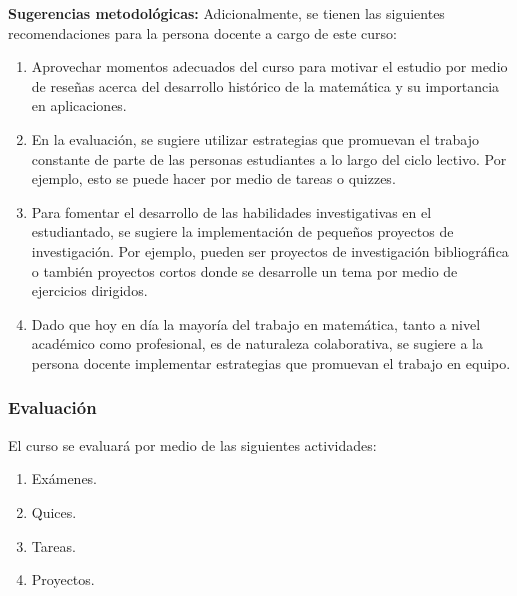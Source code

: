 \begin{refsection}
\textbf{Sugerencias metodológicas:} Adicionalmente, se tienen las siguientes recomendaciones para la persona docente a cargo de este curso:
\begin{enumerate}
    \item Aprovechar momentos adecuados del curso para motivar el estudio por medio de reseñas acerca del desarrollo histórico de la matemática y su importancia en aplicaciones.
    \item En la evaluación, se sugiere utilizar estrategias que promuevan el trabajo constante de parte de las personas estudiantes a lo largo del ciclo lectivo. Por ejemplo, esto se puede hacer por medio de tareas o quizzes.
    \item Para fomentar el desarrollo de las habilidades investigativas en el estudiantado, se sugiere la implementación de pequeños proyectos de investigación. Por ejemplo, pueden ser proyectos de investigación bibliográfica o también proyectos cortos donde se desarrolle un tema por medio de ejercicios dirigidos.
    \item Dado que hoy en día la mayoría del trabajo en matemática, tanto a nivel académico como profesional, es de naturaleza colaborativa, se sugiere a la persona docente implementar estrategias que promuevan el trabajo en equipo.
\end{enumerate}




\subsubsection*{Evaluación}

El curso se evaluará por medio de las siguientes actividades:

\begin{enumerate}
\item Exámenes.
\item Quices.
\item Tareas.
\item Proyectos.
\end{enumerate}

\nocite{Apo85}
\nocite{HK71}
\nocite{Axl15}
\nocite{Cur93}
\nocite{Tre17}
\nocite{MM18}
\nocite{GH17}




\printcursosbibliography
\end{refsection}
